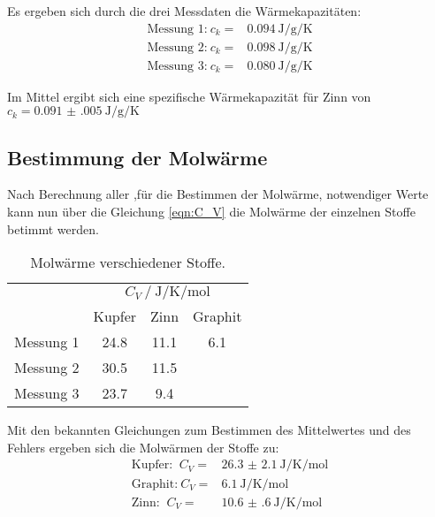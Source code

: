 Es ergeben sich durch die drei Messdaten die Wärmekapazitäten:
\begin{align*}
\text{Messung 1:} \: c_k = & \SI{0.094}{\joule\per\g\per\kelvin}   \\ 
\text{Messung 2:} \: c_k = & \SI{0.098}{\joule\per\g\per\kelvin}   \\
\text{Messung 3:} \: c_k = & \SI{0.080}{\joule\per\g\per\kelvin}
\end{align*}

Im Mittel ergibt sich eine spezifische Wärmekapazität für Zinn von $c_k=\SI{0.091(005)}{\joule\per\g\per\kelvin}$

\subsection{Bestimmung der Molwärme}
Nach Berechnung aller ,für die Bestimmen der Molwärme, notwendiger Werte kann nun über die Gleichung \eqref{eqn:C_V} die Molwärme der einzelnen Stoffe betimmt werden. 




\begin{table}
    \centering
    \caption{Molwärme verschiedener Stoffe.}
    \label{tab:m}
    \begin{tabular}{c| S S S }
        \toprule
        & \\
        & {Kupfer} & {Zinn} & {Graphit} \\
        \midrule
        Messung 1 & 24.8 & 11.1 & 6.1 \\
        Messung 2 & 30.5 & 11.5  &  \\
        Messung 3 & 23.7 & 9.4 & \\
        \bottomrule 
    \end{tabular}
\end{table}

Mit den bekannten Gleichungen zum Bestimmen des Mittelwertes und des Fehlers ergeben sich die Molwärmen der Stoffe zu:
\begin{align*}
\text{Kupfer: }\: C_V=&\SI{26.3(21)}{\joule\per\kelvin\per\mol}  \\
\text{Graphit:}\: C_V=&\SI{6.1}{\joule\per\kelvin\per\mol}  \\
\text{Zinn: }  \: C_V=&\SI{10.6(6)}{\joule\per\kelvin\per\mol}
\end{align*}


%
